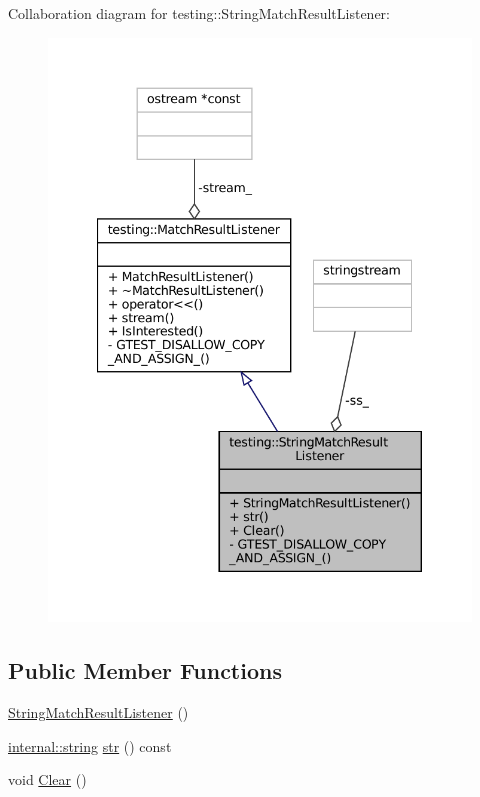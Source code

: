 Collaboration diagram for testing\+:\+:String\+Match\+Result\+Listener\+:
\nopagebreak
\begin{figure}[H]
\begin{center}
\leavevmode
\includegraphics[width=340pt]{classtesting_1_1StringMatchResultListener__coll__graph}
\end{center}
\end{figure}
\subsection*{Public Member Functions}
\begin{DoxyCompactItemize}
\item 
\hyperlink{classtesting_1_1StringMatchResultListener_a3894c8adca960a2f20a3db6a02b09238}{String\+Match\+Result\+Listener} ()
\item 
\hyperlink{namespacetesting_1_1internal_a8e8ff5b11e64078831112677156cb111}{internal\+::string} \hyperlink{classtesting_1_1StringMatchResultListener_ad1ed3c6b1077cc76b67567b33f5a2bd1}{str} () const
\item 
void \hyperlink{classtesting_1_1StringMatchResultListener_afd6e59e768516386a3908e7f5cc135d3}{Clear} ()
\end{DoxyCompactItemize}

